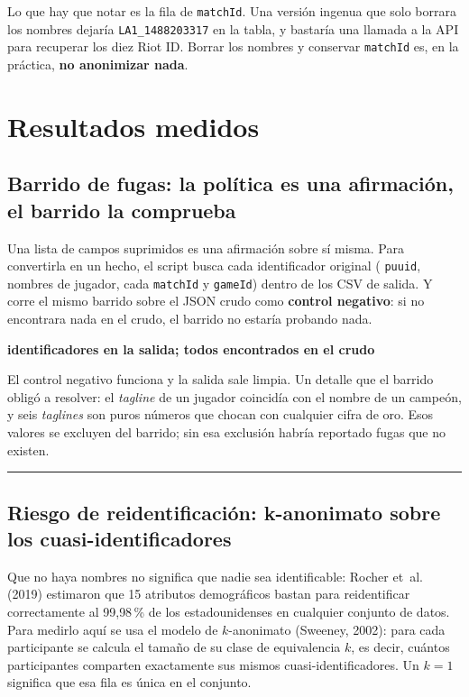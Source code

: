 \documentclass[11pt,letterpaper]{article}
\newenvironment{respuesta}[1]
  {\par\medskip\setlength{\fboxsep}{10pt}%
   \begin{lrbox}{\cajaresp}%
   \begin{minipage}{\dimexpr\linewidth-2\fboxsep-3pt\relax}%
   \color{tinta}\textcolor{azul}{\textbf{#1}}\par\smallskip\ignorespaces}
  {\end{minipage}%
   \end{lrbox}%
   \noindent\textcolor{azul}{\rule[-\dp\cajaresp]{3pt}{\dimexpr\ht\cajaresp+\dp\cajaresp\relax}}%
   \colorbox{papel}{\usebox{\cajaresp}}\par\medskip}
\begin{document}
\noindent Lo que hay que notar es la fila de \texttt{matchId}. Una versión ingenua
que solo borrara los nombres dejaría \texttt{LA1\_1488203317} en la tabla, y bastaría
una llamada a la API para recuperar los diez Riot ID. Borrar los nombres y conservar
\texttt{matchId} es, en la práctica, \textbf{no anonimizar nada}.

\section{Resultados medidos}

\subsection{Barrido de fugas: la política es una afirmación, el barrido la comprueba}

Una lista de campos suprimidos es una afirmación sobre sí misma. Para convertirla en
un hecho, el script busca cada identificador original (\nPuuid{} \texttt{puuid},
\nRiotId{} nombres de jugador, cada \texttt{matchId} y \texttt{gameId}) dentro de los
CSV de salida. Y corre el mismo barrido sobre el JSON crudo como \textbf{control
negativo}: si no encontrara nada en el crudo, el barrido no estaría probando nada.



\begin{respuesta}{\nFugas{} identificadores en la salida; todos encontrados en el crudo}
El control negativo funciona y la salida sale limpia. Un detalle que el barrido
obligó a resolver: el \emph{tagline} de un jugador coincidía con el nombre de un
campeón, y seis \emph{taglines} son puros números que chocan con cualquier cifra de
oro. Esos valores se excluyen del barrido; sin esa exclusión habría reportado fugas
que no existen.
\end{respuesta}

\subsection{Riesgo de reidentificación: k-anonimato sobre los cuasi-identificadores}
\label{sec:riesgo}

Que no haya nombres no significa que nadie sea identificable: Rocher et~al. (2019)
estimaron que 15 atributos demográficos bastan para reidentificar correctamente al
99{,}98\,\% de los estadounidenses en cualquier conjunto de datos. Para medirlo aquí se usa
el modelo de \(k\)-anonimato (Sweeney, 2002): para cada participante se calcula el
tamaño de su clase de equivalencia \(k\), es decir, cuántos
participantes comparten exactamente sus mismos cuasi-identificadores. Un \(k = 1\)
significa que esa fila es única en el conjunto.
\end{document}
